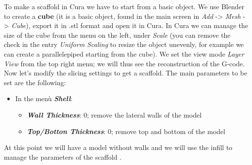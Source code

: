 To make a scaffold in Cura we have to start from a basic object. We use Blender to create a \textbf{cube} (it is a basic object, found in the main screen in \emph{Add} -> \emph{Mesh} -> \emph{Cube}), export it in .stl format and open it in Cura.
In Cura we can manage the size of the cube from the menu on the left, under \emph{Scale} (you can remove the check in the entry \emph{Uniform Scaling} to resize the object unevenly, for example we can create a parallelepiped starting from the cube). We set the view mode \emph{Layer View} from the top right menu; we will thus see the reconstruction of the G-code. \\
Now let's modify the slicing settings to get a scaffold. The main parameters to be set are the following:

\begin{itemize}

\item In the menù \emph{\textbf{Shell}}:
\begin{itemize}
\item \emph{\textbf{Wall Thickness}}: 0; remove the lateral walls of the model
\item \emph{\textbf{Top/Botton Thickness}}: 0; remove top and bottom of the model
\end{itemize}

\end{itemize}

At this point we will have a model without walls and we will use the infill to manage the parameters of the scaffold \parencite{Reference138}.

